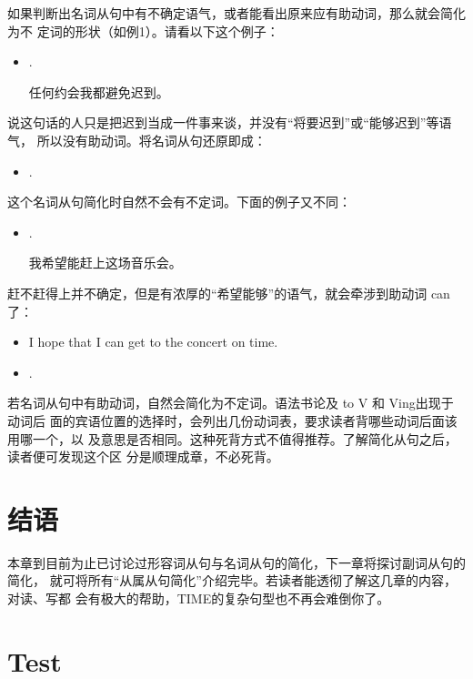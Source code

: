 如果判断出名词从句中有不确定语气，或者能看出原来应有助动词，那么就会简化为不
定词的形状（如例1）。请看以下这个例子：
\begin{itemize}
\item {}  .

  任何约会我都避免迟到。
\end{itemize}
说这句话的人只是把迟到当成一件事来谈，并没有“将要迟到”或“能够迟到”等语气，
所以没有助动词。将名词从句还原即成：
\begin{itemize}
\item {}  .
\end{itemize}

这个名词从句简化时自然不会有不定词。下面的例子又不同：
\begin{itemize}
\item {}  .

  我希望能赶上这场音乐会。
\end{itemize}
赶不赶得上并不确定，但是有浓厚的“希望能够”的语气，就会牵涉到助动词 can
了：
\begin{itemize}
\item I hope that I can get to the concert on time.

\item {}  .
\end{itemize}

若名词从句中有助动词，自然会简化为不定词。语法书论及 to V 和 Ving出现于动词后
面的宾语位置的选择时，会列出几份动词表，要求读者背哪些动词后面该用哪一个，以
及意思是否相同。这种死背方式不值得推荐。了解简化从句之后，读者便可发现这个区
分是顺理成章，不必死背。

\section{结语}

本章到目前为止已讨论过形容词从句与名词从句的简化，下一章将探讨副词从句的简化，
就可将所有“从属从句简化”介绍完毕。若读者能透彻了解这几章的内容，对读、写都
会有极大的帮助，TIME的复杂句型也不再会难倒你了。

\section{Test}

